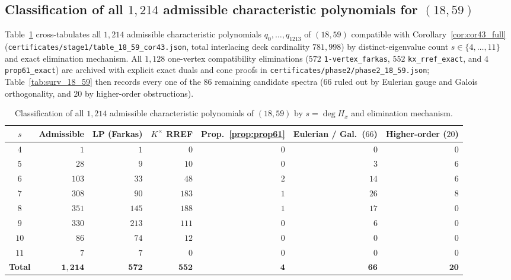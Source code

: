 \documentclass[11pt,reqno]{amsart}
\theoremstyle{definition}
\theoremstyle{remark}
\numberwithin{equation}{section}
\numberwithin{table}{section}
\begin{document}
\subsection{Classification of all \texorpdfstring{$1{,}214$}{1,214} admissible characteristic polynomials for \texorpdfstring{$(18, 59)$}{(18, 59)}}
Table~\ref{tab:18_59_by_s} cross-tabulates all $1{,}214$ admissible characteristic polynomials $q_0, \dots, q_{1213}$ of $(18, 59)$ compatible with Corollary~\ref{cor:cor43_full} (\nolinkurl{certificates/stage1/table_18_59_cor43.json}, total interlacing deck cardinality $781{,}998$) by distinct-eigenvalue count $s \in \{4, \dots, 11\}$ and exact elimination mechanism. All $1{,}128$ one-vertex compatibility eliminations ($572$ \texttt{1-vertex\_farkas}, $552$ \texttt{kx\_rref\_exact}, and $4$ \texttt{prop61\_exact}) are archived with explicit exact duals and cone proofs in \nolinkurl{certificates/phase2/phase2_18_59.json}; Table~\ref{tab:surv_18_59} then records every one of the $86$ remaining candidate spectra ($66$ ruled out by Eulerian gauge and Galois orthogonality, and $20$ by higher-order obstructions).

\begin{table}[htbp]
\centering
\caption{Classification of all $1{,}214$ admissible characteristic polynomials of $(18, 59)$ by $s = \deg H_x$ and elimination mechanism.}\label{tab:18_59_by_s}
\scriptsize
\setlength{\tabcolsep}{4.5pt}
\begin{tabular}{@{}crrrrrr@{}}
\toprule
$s$ & Admissible & LP (Farkas) & $K^\times$ RREF & Prop.~\ref{prop:prop61} & Eulerian / Gal.\ ($66$) & Higher-order ($20$) \\
\midrule
$4$ & $1$ & $1$ & $0$ & $0$ & $0$ & $0$ \\
$5$ & $28$ & $9$ & $10$ & $0$ & $3$ & $6$ \\
$6$ & $103$ & $33$ & $48$ & $2$ & $14$ & $6$ \\
$7$ & $308$ & $90$ & $183$ & $1$ & $26$ & $8$ \\
$8$ & $351$ & $145$ & $188$ & $1$ & $17$ & $0$ \\
$9$ & $330$ & $213$ & $111$ & $0$ & $6$ & $0$ \\
$10$ & $86$ & $74$ & $12$ & $0$ & $0$ & $0$ \\
$11$ & $7$ & $7$ & $0$ & $0$ & $0$ & $0$ \\
\midrule
\textbf{Total} & $\mathbf{1{,}214}$ & $\mathbf{572}$ & $\mathbf{552}$ & $\mathbf{4}$ & $\mathbf{66}$ & $\mathbf{20}$ \\
\bottomrule
\end{tabular}
\end{table}
\end{document}
